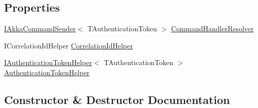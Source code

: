 \subsection*{Properties}
\begin{DoxyCompactItemize}
\item 
\hyperlink{interfaceCqrs_1_1Akka_1_1Commands_1_1IAkkaCommandSender}{I\+Akka\+Command\+Sender}$<$ T\+Authentication\+Token $>$ \hyperlink{classCqrs_1_1Akka_1_1Commands_1_1AkkaCommandBusProxy_1_1BusActor_ae58c856ec0ec0f0cf2eda4d87c56fbf1_ae58c856ec0ec0f0cf2eda4d87c56fbf1}{Command\+Handler\+Resolver}
\item 
I\+Correlation\+Id\+Helper \hyperlink{classCqrs_1_1Akka_1_1Commands_1_1AkkaCommandBusProxy_1_1BusActor_ab353a9b434004f9b0637dd5dbe4402ac_ab353a9b434004f9b0637dd5dbe4402ac}{Correlation\+Id\+Helper}
\item 
\hyperlink{interfaceCqrs_1_1Authentication_1_1IAuthenticationTokenHelper}{I\+Authentication\+Token\+Helper}$<$ T\+Authentication\+Token $>$ \hyperlink{classCqrs_1_1Akka_1_1Commands_1_1AkkaCommandBusProxy_1_1BusActor_a10dd32ee768f6ccf93aa0e04472c84b6_a10dd32ee768f6ccf93aa0e04472c84b6}{Authentication\+Token\+Helper}
\end{DoxyCompactItemize}


\subsection{Constructor \& Destructor Documentation}
\mbox{\label{classCqrs_1_1Akka_1_1Commands_1_1AkkaCommandBusProxy_1_1BusActor_a3a91b0c5338c8fbd59bd7e5751ba2f32_a3a91b0c5338c8fbd59bd7e5751ba2f32}} 
